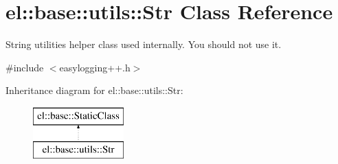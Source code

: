 \hypertarget{classel_1_1base_1_1utils_1_1_str}{}\section{el\+:\+:base\+:\+:utils\+:\+:Str Class Reference}
\label{classel_1_1base_1_1utils_1_1_str}


String utilities helper class used internally. You should not use it.  




{\ttfamily \#include $<$easylogging++.\+h$>$}

Inheritance diagram for el\+:\+:base\+:\+:utils\+:\+:Str\+:\begin{figure}[H]
\begin{center}
\leavevmode
\includegraphics[height=2.000000cm]{classel_1_1base_1_1utils_1_1_str}
\end{center}
\end{figure}
